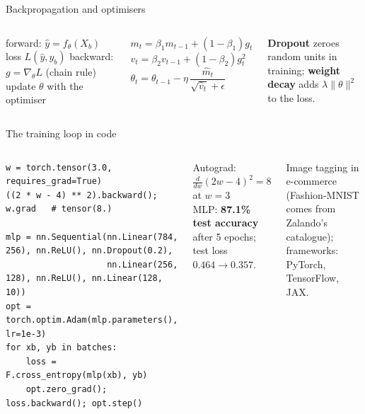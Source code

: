 \documentclass[aspectratio=169,11pt]{beamer}
\begin{document}
\begin{frame}[fragile]{Backpropagation and optimisers}
\begin{columns}[T]
\begin{balgo}
\begin{algorithmic}[1]
    \State forward: $\hat y=f_\theta(X_b)$
    \State loss $L(\hat y,y_b)$
    \State backward: $g=\nabla_\theta L$ (chain rule)
    \State update $\theta$ with the optimiser
  \EndFor
\EndFor
\end{algorithmic}
\end{balgo}
\begin{bmath}
$m_t=\beta_1m_{t-1}+(1-\beta_1)g_t$\\
$v_t=\beta_2v_{t-1}+(1-\beta_2)g_t^2$\\
$\theta_t=\theta_{t-1}-\eta\,\dfrac{\hat m_t}{\sqrt{\hat v_t}+\epsilon}$
\end{bmath}
\begin{bdef}[Regularisation]
\textbf{Dropout} zeroes random units in training; \textbf{weight decay} adds $\lambda\lVert\theta\rVert^2$ to the loss.
\end{bdef}
\end{columns}
\end{frame}

\begin{frame}[fragile]{The training loop in code}
\begin{columns}[T]
\begin{bcode}
\begin{lstlisting}
w = torch.tensor(3.0, requires_grad=True)
((2 * w - 4) ** 2).backward(); w.grad   # tensor(8.)

mlp = nn.Sequential(nn.Linear(784, 256), nn.ReLU(), nn.Dropout(0.2),
                    nn.Linear(256, 128), nn.ReLU(), nn.Linear(128, 10))
opt = torch.optim.Adam(mlp.parameters(), lr=1e-3)
for xb, yb in batches:
    loss = F.cross_entropy(mlp(xb), yb)
    opt.zero_grad(); loss.backward(); opt.step()
\end{lstlisting}
\end{bcode}
\begin{bres}
Autograd: $\frac{d}{dw}(2w-4)^2=8$ at $w=3$ \checkmark\\[2pt]
MLP: \textbf{87.1\% test accuracy} after 5 epochs; test loss $0.464\rightarrow0.357$.
\end{bres}
\begin{bapp}
Image tagging in e-commerce (Fashion-MNIST comes from Zalando's catalogue); frameworks: PyTorch, TensorFlow, JAX.
\end{bapp}
\end{columns}
\end{frame}
\end{document}
